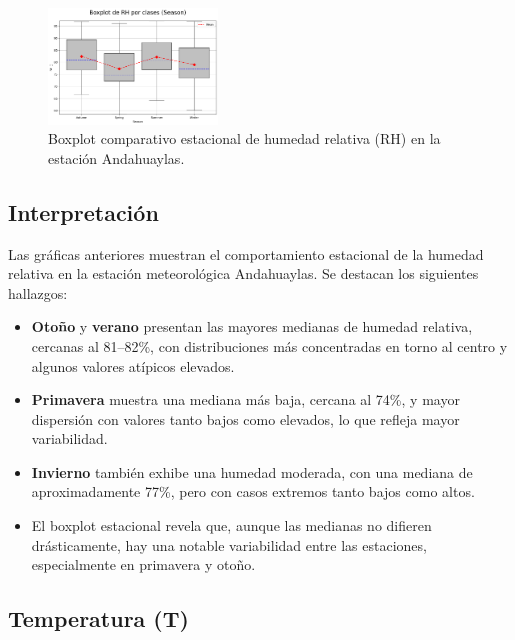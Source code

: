 \vspace{0.2cm}

\begin{figure}[H]
\centering
\includegraphics[width=0.4\textwidth]{resultados/por_estacion_del_anio/boxplot_clases_por_estacion/Andahuaylas/RH_ClassBoxplot_Season.png}
\caption{Boxplot comparativo estacional de humedad relativa (RH) en la estación Andahuaylas.}
\label{fig:andahuaylas_rh_box}
\end{figure}

\subsection*{Interpretación}

Las gráficas anteriores muestran el comportamiento estacional de la humedad relativa en la estación meteorológica Andahuaylas. Se destacan los siguientes hallazgos:

\begin{itemize}
    \item \textbf{Otoño} y \textbf{verano} presentan las mayores medianas de humedad relativa, cercanas al 81--82\%, con distribuciones más concentradas en torno al centro y algunos valores atípicos elevados.
    \item \textbf{Primavera} muestra una mediana más baja, cercana al 74\%, y mayor dispersión con valores tanto bajos como elevados, lo que refleja mayor variabilidad.
    \item \textbf{Invierno} también exhibe una humedad moderada, con una mediana de aproximadamente 77\%, pero con casos extremos tanto bajos como altos.
    \item El boxplot estacional revela que, aunque las medianas no difieren drásticamente, hay una notable variabilidad entre las estaciones, especialmente en primavera y otoño.
\end{itemize}


\subsection{Temperatura (T)}


